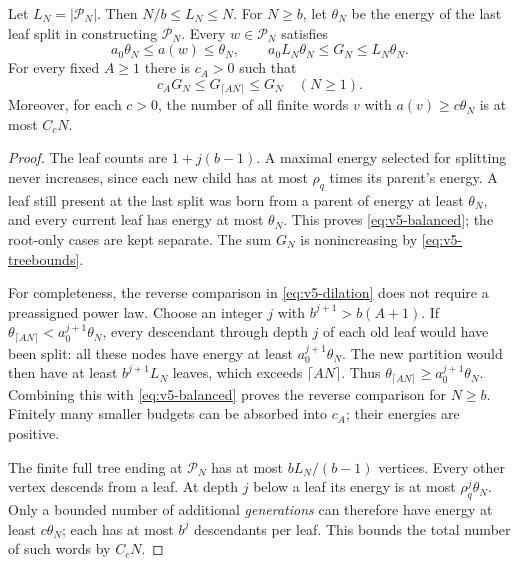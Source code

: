 \begin{lemma}\label{lem:v5-greedy}
Let $L_N=|\mathcal P_N|$. Then $N/b\le L_N\le N$.
For $N\ge b$, let $\theta_N$ be the energy of the last leaf split
in constructing $\mathcal P_N$. Every $w\in\mathcal P_N$ satisfies
\begin{equation}\label{eq:v5-balanced}
 a_0\theta_N\le a(w)\le\theta_N,
 \qquad a_0L_N\theta_N\le G_N\le L_N\theta_N.
\end{equation}
For every fixed $A\ge1$ there is $c_A>0$ such that
\begin{equation}\label{eq:v5-dilation}
 c_AG_N\le G_{\lceil AN\rceil}\le G_N
 \quad(N\ge1).
\end{equation}
Moreover, for each $c>0$, the number of all finite words $v$ with
$a(v)\ge c\theta_N$ is at most $C_cN$.
\end{lemma}

\begin{proof}
The leaf counts are $1+j(b-1)$. A maximal energy selected for
splitting never increases, since each new child has at most $\rho_q$ times
its parent's energy. A leaf still present at the last split was
born from a parent of energy at least $\theta_N$, and every current
leaf has energy at most $\theta_N$. This proves
\eqref{eq:v5-balanced}; the root-only cases are kept separate.
The sum $G_N$ is nonincreasing by \eqref{eq:v5-treebounds}.

For completeness, the reverse comparison in \eqref{eq:v5-dilation}
does not require a preassigned power law. Choose an integer $j$ with
$b^{j+1}>b(A+1)$. If
$\theta_{\lceil AN\rceil}<a_0^{j+1}\theta_N$, every descendant
through depth $j$ of each old leaf would have been split:
all these nodes have energy at least $a_0^{j+1}\theta_N$.
The new partition would then have at least $b^{j+1}L_N$
leaves, which exceeds $\lceil AN\rceil$. Thus
$\theta_{\lceil AN\rceil}\ge a_0^{j+1}\theta_N$.
Combining this with \eqref{eq:v5-balanced} proves the reverse
comparison for $N\ge b$. Finitely many smaller budgets can be
absorbed into $c_A$; their energies are positive.

The finite full tree ending at $\mathcal P_N$ has at most
$bL_N/(b-1)$ vertices. Every other vertex descends from a leaf.
At depth $j$ below a leaf its energy is at most
$\rho_q^j\theta_N$. Only a bounded number of additional
\emph{generations} can therefore have energy at least
$c\theta_N$; each has at most $b^j$ descendants per leaf.
This bounds the total number of such words by $C_cN$.
\end{proof}

